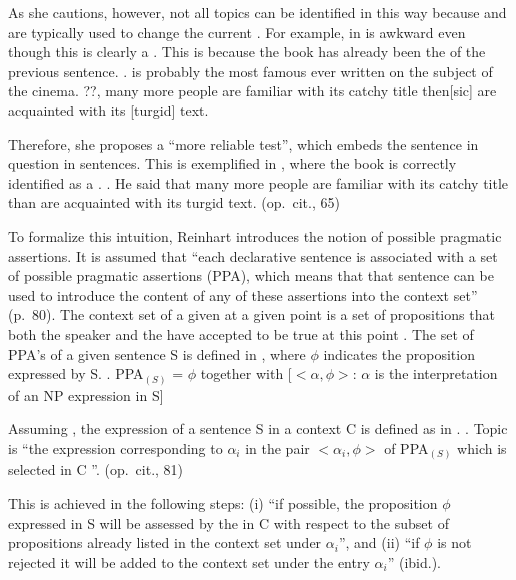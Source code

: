 As she cautions, however,
not all topics can be identified in this way
because  and  are typically used to change the current  \cite{keenanschieffelin76,durantiochs79}.
For example,  in \Next is awkward even though this is clearly a .
This is because the book has already been the  of the previous sentence.
%
\ex.  is probably the most famous ever written on the subject of the cinema.
 ??, many more people are familiar with its catchy title then[sic] are acquainted with its [turgid] text.
 \hfill{\cite[64]{reinhart81}}

Therefore, she proposes a ``more reliable test'',
which embeds the sentence in question in  sentences.
This is exemplified in \Next,
where the book is correctly identified as a .
%
\ex. He said  that many more people are familiar with its catchy title than are acquainted with its turgid text.
  \hfill{(op.~cit., 65)}


To formalize this intuition, Reinhart introduces the notion of possible pragmatic assertions.
It is assumed that ``each declarative sentence is associated with a set of possible pragmatic assertions (PPA), which means that that sentence can be used to introduce the content of any of these assertions into the context set'' (p.~80).
The context set of a given  at a given point is a set of propositions that both the speaker and the  have accepted to be true at this point \cite{stalnaker78}.
The set of PPA's of a given sentence S is defined in \Next,
where $\phi$ indicates the proposition expressed by S.
%
\ex. \label{BackExPPA} PPA$_{(S)}$ = $\phi$ together with [$<\alpha,\phi>$: $\alpha$ is the interpretation of an NP expression in S]
   \hfill{\cite[80-81]{reinhart81}}

Assuming \Last, the  expression of a sentence S in a context C
is defined as in \Next.
%
\ex. \label{BackExAboutness} Topic is ``the expression corresponding to $\alpha_{i}$ in the pair $<\alpha_{i},\phi>$ of PPA$_{(S)}$ which is selected in C ''.
    \hfill{(op.~cit., 81)}

This is achieved in the following steps:
(i) ``if possible, the proposition $\phi$ expressed in S will be assessed by the  in C with respect to the subset of propositions already listed in the context set under $\alpha_{i}$'', and
(ii) ``if $\phi$ is not rejected it will be added to the context set under the entry $\alpha_{i}$'' ({ibid.}).

